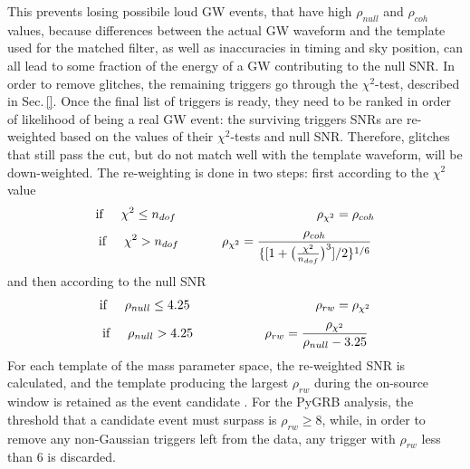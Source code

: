 \documentclass[binding=0.6cm, LaM]{sapthesis}
\begin{document}
	This prevents losing possibile loud GW events, that have high $\rho_{null}$ and $\rho_{coh}$ values,
	because differences between the actual GW waveform and the template used for the matched filter, 
	as well as inaccuracies in timing and sky position, can all lead to some fraction of the energy of a GW contributing to the null SNR. 	
	In order to remove glitches, the remaining triggers go through the $\chi^2$-test, described in Sec.\,\ref{}.
	Once the final list of triggers is ready, they need to be ranked in order of likelihood of being a real GW event:
	the surviving triggers SNRs are re-weighted based on the values of their $\chi^2$-tests and null SNR.
	Therefore, glitches that still pass the cut, but do not match well with the template waveform, will be down-weighted.
	The re-weighting is done in two steps: first according  to  the  $\chi^2$ value
		\begin{equation}
		\text{if} \hspace*{0.5cm} \chi^2 \leq n_{dof} \hspace*{3.9cm} \rho_{\chi^2} =  \rho_{coh} 
		\end{equation}
		\begin{equation}
		\text{if} \hspace*{0.5cm} \chi^2 > n_{dof} \hspace*{1.2cm} \rho_{\chi^2} =  {{\rho_{coh}}  \over {\{[1+ \big( {{\chi^2} \over {n_{dof}}} \big)^3 ]/2\}^{1/6}}}
		\end{equation}	
	and then according to the null SNR
		\begin{equation}
			\text{if} \hspace*{0.5cm} \rho_{null} \leq 4.25 \hspace*{3.5cm} \rho_{rw} = \rho_{\chi^2}
		\end{equation}
		\begin{equation}
			\text{if} \hspace*{0.5cm} \rho_{null} > 4.25 \hspace*{2cm} \rho_{rw} = {{ \rho_{\chi^2}}  \over {\rho_{null} - 3.25}}
		\end{equation}
	For each template of the mass parameter space, 
	the re-weighted SNR is calculated, and the template producing the largest $\rho_{rw}$ 
	during the on-source window is retained as the event candidate \cite{46}. 
	For the {\ttfamily PyGRB} analysis, the threshold that a candidate event must surpass is $\rho_{rw} \geq 8$,
	while, in order to remove any non-Gaussian triggers left from the data, 
	any trigger with $\rho_{rw}$ less than 6 is discarded.
\end{document}
